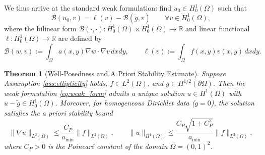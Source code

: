 \documentclass[11pt,a4paper]{article}
\newtheorem{theorem}{Theorem}[section]
\theoremstyle{definition}
\theoremstyle{remark}
\begin{document}
We thus arrive at the standard weak formulation: find $u_0 \in H_0^1(\Omega)$ such that
\begin{equation}
    \mathcal{B}(u_0, v) = \ell(v) - \mathcal{B}(\tilde{g}, v) \qquad \forall v \in H_0^1(\Omega),
    \label{eq:weak_form}
\end{equation}
where the bilinear form $\mathcal{B}(\cdot,\cdot): H_0^1(\Omega) \times H_0^1(\Omega) \to \mathbb{R}$ and linear functional $\ell: H_0^1(\Omega) \to \mathbb{R}$ are defined by
\begin{equation}
    \mathcal{B}(w, v) := \int_\Omega a(x,y)\nabla w \cdot \nabla v \, dxdy, \qquad \ell(v) := \int_\Omega f(x,y) v(x,y) \, dxdy.
    \label{eq:bilinear_def}
\end{equation}

\begin{theorem}[Well-Posedness and A Priori Stability Estimate]
\label{thm:well_posed}
Suppose Assumption \ref{ass:ellipticity} holds, $f \in L^2(\Omega)$, and $g \in H^{1/2}(\partial\Omega)$. Then the weak formulation \eqref{eq:weak_form} admits a unique solution $u \in H^1(\Omega)$ with $u - \tilde{g} \in H_0^1(\Omega)$. Moreover, for homogeneous Dirichlet data ($g = 0$), the solution satisfies the a priori stability bound
\begin{equation}
    \|\nabla u\|_{L^2(\Omega)} \le \frac{C_P}{a_{\min}} \|f\|_{L^2(\Omega)}, \qquad \|u\|_{H^1(\Omega)} \le \frac{C_P\sqrt{1+C_P^2}}{a_{\min}} \|f\|_{L^2(\Omega)},
    \label{eq:apriori_bound}
\end{equation}
where $C_P > 0$ is the Poincaré constant of the domain $\Omega = (0,1)^2$.
\end{theorem}
\end{document}
